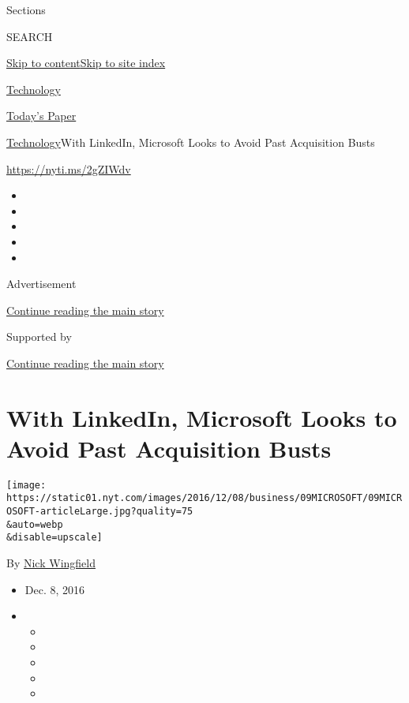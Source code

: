 Sections

SEARCH

\protect\hyperlink{site-content}{Skip to
content}\protect\hyperlink{site-index}{Skip to site index}

\href{https://www.nytimes.com/section/technology}{Technology}

\href{https://myaccount.nytimes.com/auth/login?response_type=cookie\&client_id=vi}{}

\href{https://www.nytimes.com/section/todayspaper}{Today's Paper}

\href{/section/technology}{Technology}\textbar{}With LinkedIn, Microsoft
Looks to Avoid Past Acquisition Busts

\url{https://nyti.ms/2gZIWdv}

\begin{itemize}
\item
\item
\item
\item
\item
\end{itemize}

Advertisement

\protect\hyperlink{after-top}{Continue reading the main story}

Supported by

\protect\hyperlink{after-sponsor}{Continue reading the main story}

\hypertarget{with-linkedin-microsoft-looks-to-avoid-past-acquisition-busts}{%
\section{With LinkedIn, Microsoft Looks to Avoid Past Acquisition
Busts}\label{with-linkedin-microsoft-looks-to-avoid-past-acquisition-busts}}

\texttt{[image: https://static01.nyt.com/images/2016/12/08/business/09MICROSOFT/09MICROSOFT-articleLarge.jpg?quality=75\\\&auto=webp\\\&disable=upscale]}

By \href{http://www.nytimes.com/by/nick-wingfield}{Nick Wingfield}

\begin{itemize}
\item
  Dec. 8, 2016
\item
  \begin{itemize}
  \item
  \item
  \item
  \item
  \item
  \end{itemize}
\end{itemize}

